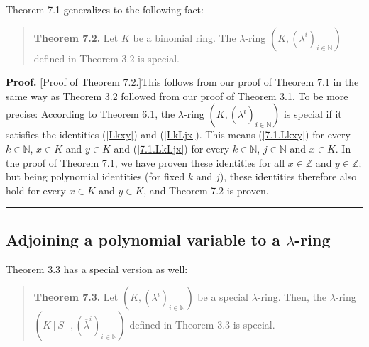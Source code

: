 \documentclass[numbers=enddot,12pt,final,onecolumn,notitlepage]{scrartcl}%
\newenvironment{proof}[1][Proof]{\noindent\textbf{#1.} }{\ \rule{0.5em}{0.5em}}
\begin{document}
Theorem 7.1 generalizes to the following fact:

\begin{quote}
\textbf{Theorem 7.2.} Let $K$ be a binomial ring. The $\lambda$-ring $\left(
K,\left(  \lambda^{i}\right)  _{i\in\mathbb{N}}\right)  $ defined in Theorem
3.2 is special.
\end{quote}

\begin{proof}
[Proof of Theorem 7.2.]This follows from our proof of Theorem 7.1 in the same
way as Theorem 3.2 followed from our proof of Theorem 3.1. To be more precise:
According to Theorem 6.1, the $\lambda$-ring $\left(  K,\left(  \lambda
^{i}\right)  _{i\in\mathbb{N}}\right)  $ is special if it satisfies the
identities (\ref{Lkxy}) and (\ref{LkLjx}). This means (\ref{7.1.Lkxy}) for
every $k\in\mathbb{N}$, $x\in K$ and $y\in K$ and (\ref{7.1.LkLjx}) for every
$k\in\mathbb{N}$, $j\in\mathbb{N}$ and $x\in K$. In the proof of Theorem 7.1,
we have proven these identities for all $x\in\mathbb{Z}$ and $y\in\mathbb{Z}$;
but being polynomial identities (for fixed $k$ and $j$), these identities
therefore also hold for every $x\in K$ and $y\in K$, and Theorem 7.2 is proven.
\end{proof}

\subsection{Adjoining a polynomial variable to a $\lambda$-ring}

Theorem 3.3 has a special version as well:

\begin{quote}
\textbf{Theorem 7.3.} Let $\left(  K,\left(  \lambda^{i}\right)
_{i\in\mathbb{N}}\right)  $ be a special $\lambda$-ring. Then, the $\lambda
$-ring $\left(  K\left[  S\right]  ,\left(  \overline{\lambda}^{i}\right)
_{i\in\mathbb{N}}\right)  $ defined in Theorem 3.3 is special.
\end{quote}
\end{document}
